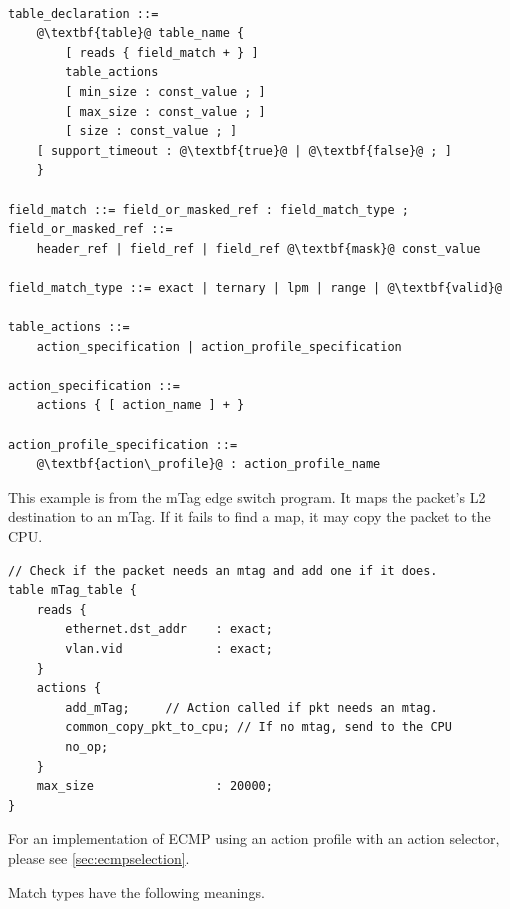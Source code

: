 \documentclass[12pt]{article}
\begin{document}
\begin{lstlisting}[frame=single,backgroundcolor=\color{bnfgreen},escapechar=\@]

table_declaration ::=
    @\textbf{table}@ table_name {
        [ reads { field_match + } ]
        table_actions
        [ min_size : const_value ; ]
        [ max_size : const_value ; ]
        [ size : const_value ; ]
	[ support_timeout : @\textbf{true}@ | @\textbf{false}@ ; ]
    }

field_match ::= field_or_masked_ref : field_match_type ;
field_or_masked_ref ::= 
    header_ref | field_ref | field_ref @\textbf{mask}@ const_value

field_match_type ::= exact | ternary | lpm | range | @\textbf{valid}@

table_actions ::= 
    action_specification | action_profile_specification

action_specification ::= 
    actions { [ action_name ] + }

action_profile_specification ::= 
    @\textbf{action\_profile}@ : action_profile_name

\end{lstlisting}

This example is from the mTag edge switch program.  It maps the packet's 
L2 destination to an mTag. If it fails to find a map, it may copy the packet 
to the CPU.

\begin{lstlisting}[keywords={},frame=single,escapechar=\@]
// Check if the packet needs an mtag and add one if it does.
table mTag_table {
    reads {
        ethernet.dst_addr    : exact;
        vlan.vid             : exact;
    }
    actions {
        add_mTag;     // Action called if pkt needs an mtag.
        common_copy_pkt_to_cpu; // If no mtag, send to the CPU
        no_op;
    }
    max_size                 : 20000;
}
\end{lstlisting}

For an implementation of ECMP using an action profile with an action selector,
please see \ref{sec:ecmpselection}.


Match types have the following meanings.
\end{document}
